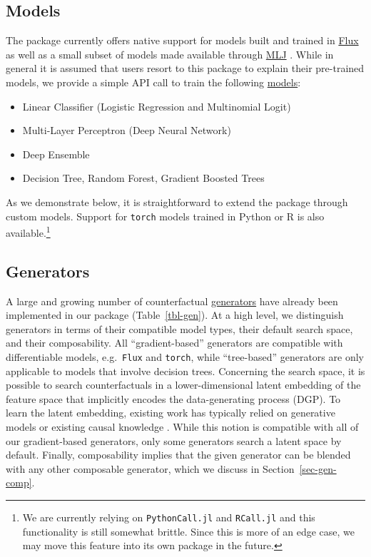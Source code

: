 \documentclass{juliacon}
\providecommand{\tightlist}{%
  \setlength{\itemsep}{0pt}\setlength{\parskip}{0pt}}\usepackage{longtable,booktabs,array}
\begin{document}
\hypertarget{models}{%
\subsection{Models}\label{models}}

The package currently offers native support for models built and trained
in \href{https://fluxml.ai/}{Flux} \autocite{innes2018flux} as well as a
small subset of models made available through
\href{https://alan-turing-institute.github.io/MLJ.jl/dev/}{MLJ}
\autocite{blaom2020mlj}. While in general it is assumed that users
resort to this package to explain their pre-trained models, we provide a
simple API call to train the following
\href{https://juliatrustworthyai.github.io/CounterfactualExplanations.jl/v0.1/tutorials/model_catalogue/}{models}:

\begin{itemize}
\tightlist
\item
  Linear Classifier (Logistic Regression and Multinomial Logit)
\item
  Multi-Layer Perceptron (Deep Neural Network)
\item
  Deep Ensemble \textcite{lakshminarayanan2016simple}
\item
  Decision Tree, Random Forest, Gradient Boosted Trees
\end{itemize}

As we demonstrate below, it is straightforward to extend the package
through custom models. Support for \texttt{torch} models trained in
Python or R is also available.\footnote{We are currently relying on
  \texttt{PythonCall.jl} and \texttt{RCall.jl} and this functionality is
  still somewhat brittle. Since this is more of an edge case, we may
  move this feature into its own package in the future.}

\hypertarget{sec-gen}{%
\subsection{Generators}\label{sec-gen}}

A large and growing number of counterfactual
\href{https://juliatrustworthyai.github.io/CounterfactualExplanations.jl/v0.1/explanation/generators/overview/}{generators}
have already been implemented in our package (Table~\ref{tbl-gen}). At a
high level, we distinguish generators in terms of their compatible model
types, their default search space, and their composability. All
``gradient-based'' generators are compatible with differentiable models,
e.g.~\texttt{Flux} and \texttt{torch}, while ``tree-based'' generators
are only applicable to models that involve decision trees. Concerning
the search space, it is possible to search counterfactuals in a
lower-dimensional latent embedding of the feature space that implicitly
encodes the data-generating process (DGP). To learn the latent
embedding, existing work has typically relied on generative models or
existing causal knowledge
\autocite{joshi2019realistic,karimi2021algorithmic}. While this notion
is compatible with all of our gradient-based generators, only some
generators search a latent space by default. Finally, composability
implies that the given generator can be blended with any other
composable generator, which we discuss in Section~\ref{sec-gen-comp}.
\end{document}
